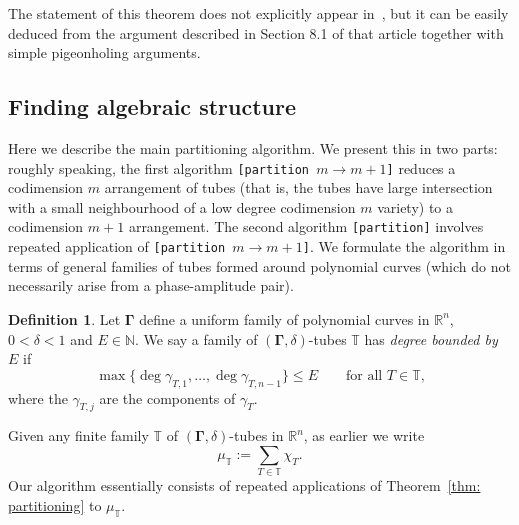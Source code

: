\documentclass[reqno]{amsart}
\numberwithin{equation}{section}
\newcommand{\N}{\mathbb{N}}
\newcommand{\R}{\mathbb{R}}
\newcommand{\T}{\mathbb{T}}
\newcommand{\bdGamma}{\boldsymbol{\Gamma}}
\theoremstyle{plain}
\theoremstyle{definition}
\newtheorem{definition}[theorem]{Definition}
\begin{document}
 The statement of this theorem does not explicitly appear in~\cite{Guth2018}, but it can be easily deduced from the argument described in Section 8.1 of that article together with simple pigeonholing arguments.







\subsection{Finding algebraic structure} Here we describe the main partitioning algorithm. We present this in two parts: roughly speaking, the first algorithm \texttt{[partition $m \to m+1$]} reduces a codimension $m$ arrangement of tubes (that is, the tubes have large intersection with a small neighbourhood of a low degree codimension $m$ variety) to a codimension $m+1$ arrangement. The second algorithm \texttt{[partition]} involves repeated application of \texttt{[partition $m \to m+1$]}. We formulate the algorithm in terms of general families of tubes formed around polynomial curves (which do not necessarily arise from a phase-amplitude pair).  

\begin{definition} Let $\bdGamma$ define a uniform family of polynomial curves in $\R^n$, $0 < \delta < 1$ and $E \in \N$. We say a family of $(\bdGamma, \delta)$-tubes $\T$ has \textit{degree bounded by $E$} if
\begin{equation*}
    \max\{\deg \gamma_{T,1}, \dots, \deg \gamma_{T,n-1}\} \leq E \qquad \textrm{for all $T \in \T$,}
\end{equation*}
where the $\gamma_{T,j}$ are the components of $\gamma_T$.
\end{definition}

Given any finite family $\T$ of $(\bdGamma, \delta)$-tubes in $\R^n$, as earlier we write
\begin{equation*}
    \mu_{\T} := \sum_{T \in \T} \chi_T.
\end{equation*}
Our algorithm essentially consists of repeated applications of Theorem~\ref{thm: partitioning} to $\mu_{\T}$.\medskip


\end{document}
